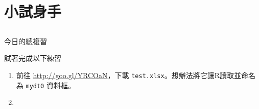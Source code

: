\documentclass[12pt, aspectratio=43]{beamer}
\begin{document}
\section{小試身手}\subsection{}

\begin{frame}[fragile]{今日的總複習}
\begin{description}
\item[]
\end{description}
\end{frame}


\begin{frame}[fragile]{試著完成以下練習}
\begin{enumerate}
\item 前往 \url{http://goo.gl/YRCOaN}，下載 \verb+test.xlsx+。想辦法將它讓R讀取並命名為 \verb+mydt0+ 資料框。
\item 
\end{enumerate}
\end{frame}
\end{document}
